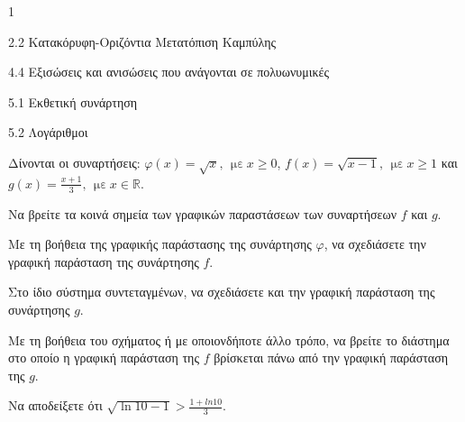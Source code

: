 \begin{ylh}{1}
\item 2.2 Κατακόρυφη-Οριζόντια Μετατόπιση Καμπύλης
\item 4.4 Εξισώσεις και ανισώσεις που ανάγονται σε πολυωνυμικές
\item 5.1 Εκθετική συνάρτηση
\item 5.2 Λογάριθμοι
\end{ylh}
Δίνονται οι συναρτήσεις: $\varphi(x) = \sqrt{x},\ \ \text{με}\ x \geq 0$, $f(x) = \sqrt{x - 1},\ \ \text{με}\ x \geq 1$ και $g(x) = \frac{x + 1}{3},\ \ \text{με}\ x \in \mathbb{R}$.
\begin{center}
\end{center}
\begin{alist}
\item Να βρείτε τα κοινά σημεία των γραφικών παραστάσεων των συναρτήσεων $f$ και $g$.
\item Με τη βοήθεια της γραφικής παράστασης της συνάρτησης $\varphi$, να σχεδιάσετε την γραφική παράσταση της συνάρτησης $f$.
\item Στο ίδιο σύστημα συντεταγμένων, να σχεδιάσετε και την γραφική παράσταση της συνάρτησης $g$.
\item Με τη βοήθεια του σχήματος ή με οποιονδήποτε άλλο τρόπο, να βρείτε το διάστημα στο οποίο η γραφική παράσταση της $f$ βρίσκεται πάνω από την γραφική παράσταση της $g$.
\item Να αποδείξετε ότι $\sqrt{\ln 10 - 1} > \frac{1 + ln10}{3}$.
\end{alist}

